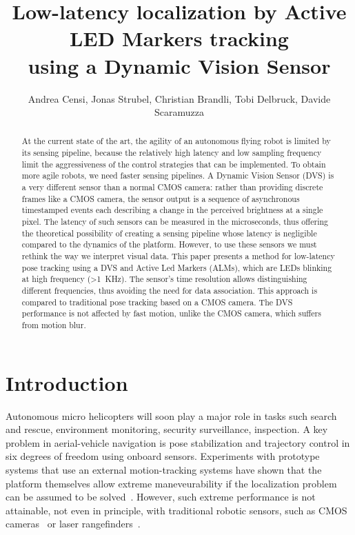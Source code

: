
\title{\LARGE\bf Low-latency localization by Active LED Markers tracking
\\
using a Dynamic Vision Sensor}


\author{Andrea Censi\mythanks, Jonas Strubel, Christian Brandli, Tobi Delbruck,
Davide Scaramuzza}
\maketitle
\begin{abstract}
At the current state of the art, the agility of an autonomous flying
robot is limited by its sensing pipeline, because the relatively high
latency and low sampling frequency limit the aggressiveness of the
control strategies that can be implemented. To obtain more agile robots,
we need faster sensing pipelines. A Dynamic Vision Sensor (DVS) is
a very different sensor than a normal CMOS camera: rather than providing
discrete frames like a CMOS camera, the sensor output is a sequence
of asynchronous timestamped events each describing a change in the
perceived brightness at a single pixel. The latency of such sensors
can be measured in the microseconds, thus offering the theoretical
possibility of creating a sensing pipeline whose latency is negligible
compared to the dynamics of the platform. However, to use these sensors
we must rethink the way we interpret visual data. This paper presents
a method for low-latency pose tracking using a DVS and Active Led
Markers (ALMs), which are LEDs blinking at high frequency (>1~KHz).
The sensor's time resolution allows distinguishing different frequencies,
thus avoiding the need for data association. This approach is compared
to traditional pose tracking based on a CMOS camera. The DVS performance
is not affected by fast motion, unlike the CMOS camera, which suffers
from motion blur. 
\end{abstract}

\section{Introduction}

Autonomous micro helicopters will soon play a major role in tasks
such search and rescue, environment monitoring, security surveillance,
inspection. A key problem in aerial-vehicle navigation is pose stabilization
and trajectory control in six degrees of freedom using onboard sensors.
Experiments with prototype systems that use an external motion-tracking
systems have shown that the platform themselves allow extreme maneveurability
if the localization problem can be assumed to be solved~\cite{Lupashin2012}.
However, such extreme performance is not attainable, not even in principle,
with traditional robotic sensors, such as CMOS cameras~\cite{Weiss2011}
or laser rangefinders~\cite{Shen2011}.

